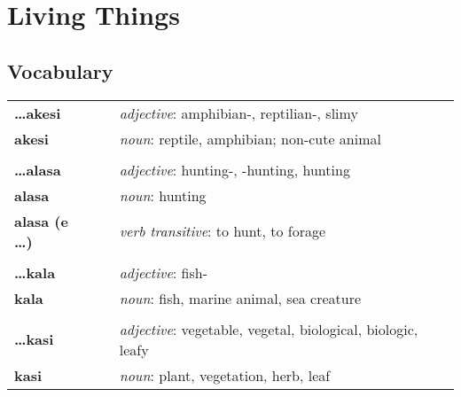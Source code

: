 
\section{Living Things}
\subsection*{Vocabulary}

\begin{supertabular}{p{2,5cm}|ll}
    \textbf{\dots akesi}      &  & \textit{adjective}: amphibian-, reptilian-, slimy                                                 \\
    \textbf{akesi}            &  & \textit{noun}: reptile, amphibian; non-cute animal                                                \\
                              &  &                                                                                                   \\
    \textbf{\dots alasa}      &  & \textit{adjective}: hunting-, -hunting, hunting                                                   \\
    \textbf{alasa}            &  & \textit{noun}: hunting                                                                            \\
    \textbf{alasa (e \dots)}  &  & \textit{verb transitive}: to hunt, to forage                                                      \\
                              &  &                                                                                                   \\
    \textbf{\dots kala}       &  & \textit{adjective}: fish-                                                                         \\
    \textbf{kala}             &  & \textit{noun}: fish, marine animal, sea creature                                                  \\
                              &  &                                                                                                   \\
    \textbf{\dots kasi}       &  & \textit{adjective}: vegetable, vegetal, biological, biologic, leafy                               \\
    \textbf{kasi}             &  & \textit{noun}: plant, vegetation, herb, leaf                                                      \\

\end{supertabular}
